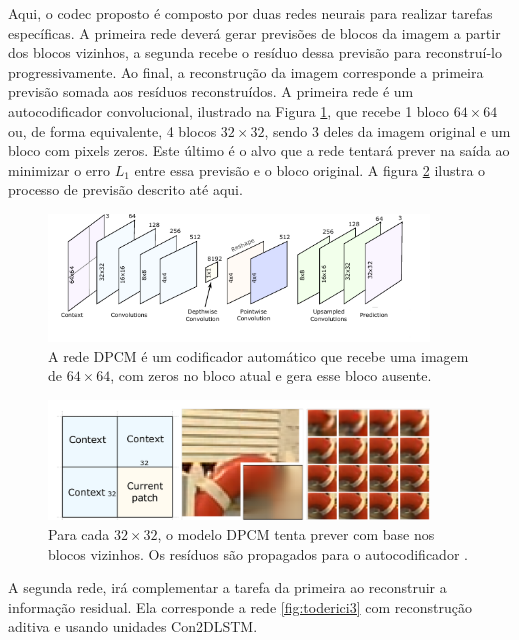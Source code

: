 Aqui, o codec proposto é composto por duas redes neurais para realizar tarefas específicas. A primeira rede deverá gerar previsões de blocos da imagem a partir dos blocos vizinhos, a segunda recebe o resíduo dessa previsão para reconstruí-lo progressivamente. 
Ao final, a reconstrução da imagem corresponde a primeira previsão somada aos resíduos reconstruídos. A primeira rede é um autocodificador convolucional, ilustrado na Figura \ref{fig:toderici8}, que recebe 1 bloco $64 \times 64$ ou, de forma equivalente, 4 blocos $32 \times 32$, sendo 3 deles da imagem original e um bloco com pixels zeros. Este último é o alvo que a rede tentará prever na saída ao minimizar o erro $L_1$ entre essa previsão e o bloco original.  A figura \ref{fig:toderici7} ilustra o processo de previsão descrito até aqui.     


\begin{figure}
	\centering
	\includegraphics[width=0.90\textwidth]{figuras/toderici_8.pdf}
	\caption[Modelo DPCM com autocodificador]{A rede DPCM é um codificador automático que recebe uma imagem de $64 \times 64$, com zeros no bloco atual e gera esse bloco ausente\cite{SpatiallyAdaptive2018Minnen}.}
	\label{fig:toderici8}
\end{figure}

\begin{figure}
	\centering
	\includegraphics[width=0.90\textwidth]{figuras/toderici_7.pdf}
	\caption[]{Para cada  $32 \times 32$, o modelo DPCM tenta prever com base nos blocos vizinhos. Os resíduos são propagados para o autocodificador \cite{SpatiallyAdaptive2018Minnen}.}
	\label{fig:toderici7}
\end{figure}

A segunda rede, irá complementar a tarefa da primeira ao reconstruir a informação residual. Ela corresponde a rede \ref{fig:toderici3} com reconstrução aditiva e usando unidades Con2DLSTM. 

